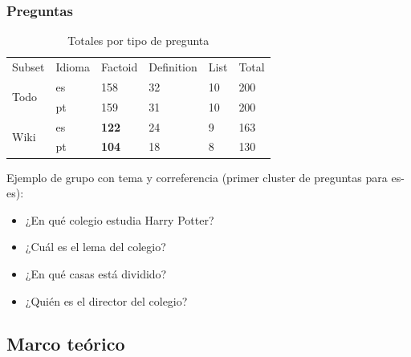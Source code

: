 \begin{frame}
\frametitle{Preguntas}
  \begin{center}
  \begin{table}
  \centering
  \begin{tabular}{| l | l | l | l | l | l |}
  
  Subset & Idioma & Factoid & Definition & List & Total \\ 
  \multirow{2}{*}{Todo} & es & 158 & 32 & 10 & 200 \\ 
   & pt & 159 & 31 & 10 & 200 \\ \hline
   \multirow{2}{*}{Wiki} & es & \textbf{122} & 24 & 9 & 163 \\ 
   & pt & \textbf{104} & 18 & 8 & 130 \\ 
  \end{tabular}
  \caption{Totales por tipo de pregunta}
  \label{table:totals-type-question}
  \end{table}
  \end{center}

  Ejemplo de grupo con tema y correferencia (primer cluster de preguntas para es-es):
  \begin{itemize}
  \item ¿En qué colegio estudia Harry Potter?
  \item ¿Cuál es el lema del colegio?
  \item ¿En qué casas está dividido?
  \item ¿Quién es el director del colegio?
  \end{itemize}

\end{frame}


\subsection{Marco teórico}


